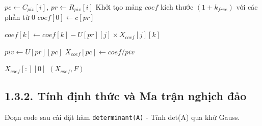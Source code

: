 \begin{algorithm}[H]
\caption{Quá trình Thế ngược (Back Substitution) - Phần 2: Giải nghiệm}
\label{alg:back_substitution_2}
\begin{algorithmic}[1]
 
    
    \State {}
        \State $pc \gets C_{piv}[i]$, $pr \gets R_{piv}[i]$
        \State Khởi tạo mảng $coef$ kích thước $(1 + k_{free})$ với các phần tử $0$
        \State $coef[0] \gets c[pr]$ 
        
                    \State $coef[k] \gets coef[k] - U[pr][j] \times X_{coef}[j][k]$
                \EndFor
            \EndIf
        \EndFor
        
        \State $piv \gets U[pr][pc]$
        \State $X_{coef}[pc] \gets coef / piv$ 
    \EndFor
    
    \State {}
        \State \Return $X_{coef}[:][0]$ 
    \Else
        \State \Return $(X_{coef}, F)$ 
    \EndIf
\EndProcedure
\end{algorithmic}
\end{algorithm}

\subsection*{1.3.2. Tính định thức và Ma trận nghịch đảo}
{}

Đoạn code sau cài đặt hàm \texttt{determinant(A)} - Tính det(A) qua khử Gauss.


